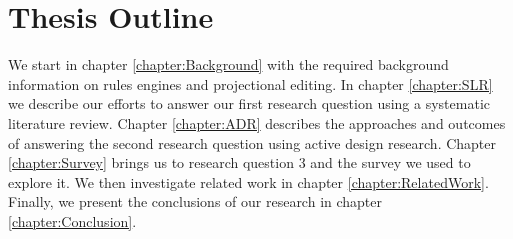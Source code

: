 \section{Thesis Outline}

We start in chapter \ref{chapter:Background} with the required background information on rules engines and projectional editing.
In chapter \ref{chapter:SLR} we describe our efforts to answer our first research question using a systematic literature review.
Chapter \ref{chapter:ADR} describes the approaches and outcomes of answering the second research question using active design research. 
Chapter \ref{chapter:Survey} brings us to research question 3 and the survey we used to explore it.
We then investigate related work in chapter \ref{chapter:RelatedWork}.
Finally, we present the conclusions of our research in chapter \ref{chapter:Conclusion}.
